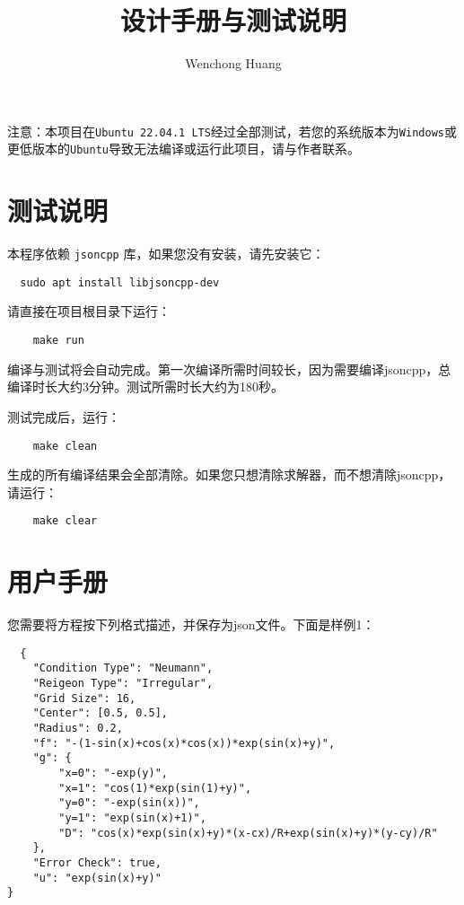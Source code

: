 \documentclass[lang=cn,11pt,a4paper]{elegantpaper}
\title{设计手册与测试说明}
\author{Wenchong Huang}
\date{\zhtoday}
\begin{document}
\maketitle

注意：本项目在\verb|Ubuntu 22.04.1 LTS|经过全部测试，若您的系统版本为\verb|Windows|或更低版本的\verb|Ubuntu|导致无法编译或运行此项目，请与作者联系。

\section{测试说明}

本程序依赖 \verb|jsoncpp| 库，如果您没有安装，请先安装它：
\begin{lstlisting}
  sudo apt install libjsoncpp-dev
\end{lstlisting}

请直接在项目根目录下运行：
\begin{lstlisting}
    make run
\end{lstlisting}

编译与测试将会自动完成。第一次编译所需时间较长，因为需要编译jsoncpp，总编译时长大约3分钟。测试所需时长大约为180秒。

测试完成后，运行：
\begin{lstlisting}
    make clean
\end{lstlisting}

生成的所有编译结果会全部清除。如果您只想清除求解器，而不想清除jsoncpp，请运行：
\begin{lstlisting}
    make clear
\end{lstlisting}

\section{用户手册}

您需要将方程按下列格式描述，并保存为json文件。下面是样例1：

\begin{lstlisting}
  {
    "Condition Type": "Neumann",
    "Reigeon Type": "Irregular",
    "Grid Size": 16,
    "Center": [0.5, 0.5],
    "Radius": 0.2,
    "f": "-(1-sin(x)+cos(x)*cos(x))*exp(sin(x)+y)",
    "g": {
        "x=0": "-exp(y)",
        "x=1": "cos(1)*exp(sin(1)+y)",
        "y=0": "-exp(sin(x))",
        "y=1": "exp(sin(x)+1)",
        "D": "cos(x)*exp(sin(x)+y)*(x-cx)/R+exp(sin(x)+y)*(y-cy)/R"
    },
    "Error Check": true,
    "u": "exp(sin(x)+y)"
}
\end{lstlisting}
\end{document}
